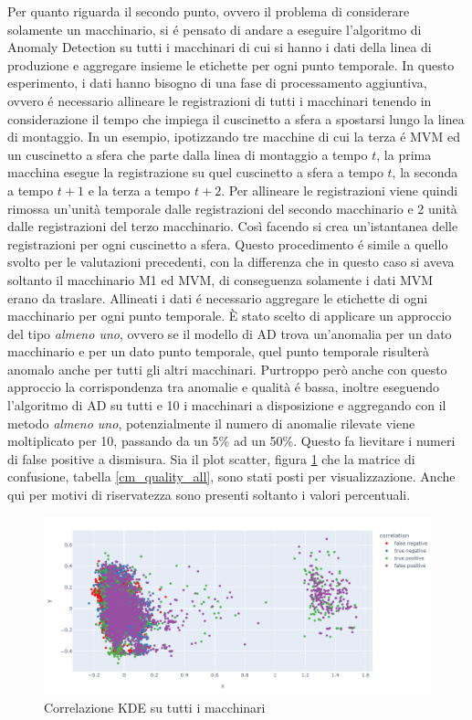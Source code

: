 Per quanto riguarda il secondo punto, ovvero il problema di considerare solamente un macchinario, si é pensato di andare a eseguire l'algoritmo di Anomaly Detection su tutti i macchinari di cui si hanno i dati della linea di produzione e aggregare insieme le etichette per ogni punto temporale.
In questo esperimento, i dati hanno bisogno di una fase di processamento aggiuntiva, ovvero é necessario allineare le registrazioni di tutti i macchinari tenendo in considerazione il tempo che impiega il cuscinetto a sfera a spostarsi lungo la linea di montaggio. In un esempio, ipotizzando tre macchine di cui la terza é MVM ed un cuscinetto a sfera che parte dalla linea di montaggio a tempo $t$, la prima macchina esegue la registrazione su quel cuscinetto a sfera a tempo $t$, la seconda a tempo $t+1$ e la terza a tempo $t+2$. Per allineare le registrazioni viene quindi rimossa un'unità temporale dalle registrazioni del secondo macchinario e 2 unità dalle registrazioni del terzo macchinario. Così facendo si crea un'istantanea delle registrazioni per ogni cuscinetto a sfera. Questo procedimento é simile a quello svolto per le valutazioni precedenti, con la differenza che in questo caso si aveva soltanto il macchinario M1 ed MVM, di conseguenza solamente i dati MVM erano da traslare.
Allineati i dati é necessario aggregare le etichette di ogni macchinario per ogni punto temporale. È stato scelto di applicare un approccio del tipo \textit{almeno uno}, ovvero se il modello di AD trova un'anomalia per un dato macchinario e per un dato punto temporale, quel punto temporale risulterà anomalo anche per tutti gli altri macchinari. 
Purtroppo però anche con questo approccio la corrispondenza tra anomalie e qualità é bassa, inoltre eseguendo l'algoritmo di AD su tutti e 10 i macchinari a disposizione e aggregando con il metodo \textit{almeno uno}, potenzialmente il numero di anomalie rilevate viene moltiplicato per 10, passando da un 5\% ad un 50\%. Questo fa lievitare i numeri di false positive a dismisura. Sia il plot scatter, figura \ref{quality_all_machines} che la matrice di confusione, tabella \ref{cm_quality_all}, sono stati posti per visualizzazione. Anche qui per motivi di riservatezza sono presenti soltanto i valori percentuali.

\begin{figure}[t]
	\centering
	\includegraphics[width=14cm, scale=1]{images/correlation_all_quality_plot.png}
	\caption{Correlazione KDE su tutti i macchinari}
	\label{quality_all_machines}
\end{figure}

